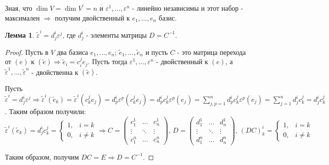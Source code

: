 \documentclass[12pt]{article}
\newcommand{\VE}{\varepsilon}
\theoremstyle{definition}
\newtheorem{lemma}{Лемма}
\begin{document}
Зная, что $\dim{V} = \dim{V^\prime} =n$ и $\VE^1,\dotsc, \VE^n$ - линейно независимы и этот набор - максимален $\Rightarrow$ получим двойственный к $e_1, \dotsc, e_n$ базис.

\begin{lemma}
	$\tilde{\VE}^i = d_j^i \VE^j$, где $d_j^i$ - элементы матрицы $D = C^{-1}$.
\end{lemma}
\begin{proof}
	Пусть в $V$ два базиса $e_1, \dotsc, e_n; \, \tilde{e}_1, \dotsc, \tilde{e}_n$ и пусть $C$ - это матрица перехода от $(e)$ к $(\tilde{e}) \Rightarrow \tilde{e}_i = c_i^j e_j$. Пусть тогда $\VE^1, \dotsc, \VE^n$ - двойственный к $(e)$, а $\tilde{\VE}^1, \dotsc, \tilde{\VE}^n$ - двойственна к $(\tilde{e})$.
	
	Пусть $\tilde{\VE}^i = d_j^i \VE^j \Rightarrow \tilde{\VE}^i(\tilde{e}_k) = \tilde{\VE}^i(c_k^je_j) = d_p^i \VE^p(c_k^je_j) = d_p^i c_k^j\VE^p(e_j) = \displaystyle \sum\limits_{j,p = 1}^n d_p^i c_k^j \VE^p(e_j) = \displaystyle \sum\limits_{j= 1}^n d_j^i c_k^j = d_j^i c_k^j$. Таким образом получили:
	$$
		\tilde{\VE}^i(\tilde{e}_k) = d_j^i c_k^j = \begin{cases} 1, & i = k \\ 0, & i \neq k \end{cases} \Rightarrow 
		C = 
		\begin{pmatrix} 
			c_1^1 & \dotsc & c_n^1\\ 
			\vdots & \ddots & \vdots \\ 
			c_1^n & \dotsc & c_n^n
		\end{pmatrix}, \, 
		D = 
		\begin{pmatrix} 
			d_1^1 & \dotsc & d_n^1\\ 
			\vdots & \ddots & \vdots \\ 
			d_1^n & \dotsc & d_n^n
		\end{pmatrix}, \, 
		(DC)_k^i = \begin{cases} 1, & i = k \\ 0, & i \neq k \end{cases}
	$$
	
	Таким образом, получим $DC = E \Rightarrow D = C^{-1}$.
\end{proof}
\end{document}
